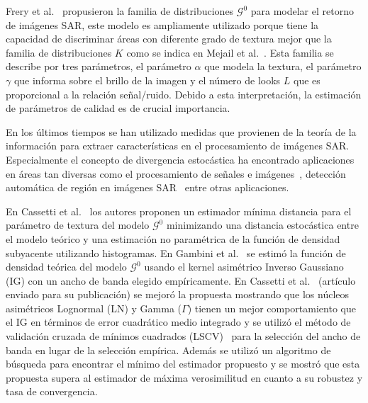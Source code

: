 \documentclass[11pt]{article}
\begin{document}
Frery et al.~\cite{Frery97} propusieron la familia de distribuciones $\mathcal{G}^0$ para modelar el retorno de imágenes SAR, este modelo es ampliamente utilizado porque tiene la capacidad de discriminar áreas con diferente grado de textura mejor que la familia de distribuciones $K$ como se indica en Mejail et al.~\cite{MejailJacoboFreryBustos:IJRS}.
Esta familia se describe por tres parámetros, el parámetro $\alpha$ que modela la textura, el parámetro $\gamma$ que informa sobre el brillo de la imagen y el número de looks $L$ que es proporcional a la relación señal/ruido. 
Debido a esta interpretación, la estimación de parámetros de calidad es de crucial importancia.

En los últimos tiempos se han utilizado medidas que provienen de la teoría de la información para extraer características en el procesamiento de imágenes SAR. 
Especialmente el concepto de divergencia estocástica ha encontrado aplicaciones en áreas tan diversas como el procesamiento de señales e imágenes~\cite {Aviyente2007}, detección automática de región en imágenes SAR~\cite{SilvaCribariFrery:ImprovedLikelihood:Environmetrics, Nascimento2009} entre otras aplicaciones.

En Cassetti et al.~\cite{APSAR2013ParameterEstimationStochasticDistances} los autores proponen un estimador mínima distancia para el parámetro de textura del modelo $\mathcal{G}^0$ minimizando una distancia estocástica entre el modelo teórico y una estimación no paramétrica de la función de densidad subyacente utilizando histogramas. En Gambini et al.~\cite{gambini2015} se estimó la función de densidad teórica del modelo $\mathcal{G}^0$  usando el kernel asimétrico Inverso Gaussiano (IG) con un ancho de banda elegido empíricamente. 
En Cassetti et al.~\cite{Cassetti2020} (artículo enviado para su publicación) se mejoró la propuesta mostrando que los núcleos asimétricos Lognormal (LN) y Gamma ($\Gamma$) tienen un mejor comportamiento que el IG en términos de error cuadrático medio integrado y se utilizó el método de validación cruzada de mínimos cuadrados (LSCV)~\cite{Rudemo1982} para la selección del ancho de banda en lugar de la selección empírica. Además se utilizó un algoritmo de búsqueda para encontrar el mínimo del estimador propuesto y se mostró que esta propuesta supera al estimador de máxima verosimilitud en cuanto a su robustez y tasa de convergencia.
\end{document}
